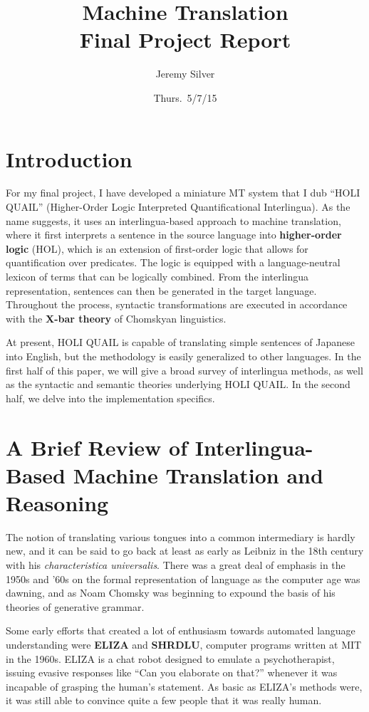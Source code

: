 \documentclass[11pt, oneside]{article}      %
\title{Machine Translation \\ Final Project Report}
\author{Jeremy Silver}
\date{Thurs.\ 5/7/15}                          %
\begin{document}
\maketitle

\section{Introduction}

For my final project, I have developed a miniature MT system that I dub ``HOLI QUAIL'' (Higher-Order Logic Interpreted Quantificational Interlingua).  As the name suggests, it uses an interlingua-based approach to machine translation, where it first interprets a sentence in the source language into \textbf{higher-order logic} (HOL), which is an extension of first-order logic that allows for quantification over predicates.  The logic is equipped with a language-neutral lexicon of terms that can be logically combined.  From the interlingua representation, sentences can then be generated in the target language.  Throughout the process, syntactic transformations are executed in accordance with the \textbf{X-bar theory} of Chomskyan linguistics.  

At present, HOLI QUAIL is capable of translating simple sentences of Japanese into English, but the methodology is easily generalized to other languages.  In the first half of this paper, we will give a broad survey of interlingua methods, as well as the syntactic and semantic theories underlying HOLI QUAIL.  In the second half, we delve into the implementation specifics.

\section{A Brief Review of Interlingua-Based Machine Translation and Reasoning }

The notion of translating various tongues into a common intermediary is hardly new, and it can be said to go back at least as early as Leibniz in the 18th century with his \textit{characteristica universalis}.  There was a great deal of emphasis in the 1950s and '60s on the formal representation of language as the computer age was dawning, and as Noam Chomsky was beginning to expound the basis of his theories of generative grammar.  

Some early efforts that created a lot of enthusiasm towards automated language understanding were \textbf{ELIZA} and \textbf{SHRDLU}, computer programs written at MIT in the 1960s.  ELIZA is a chat robot designed to emulate a psychotherapist, issuing evasive responses like ``Can you elaborate on that?'' whenever it was incapable of grasping the human's statement.  As basic as ELIZA's methods were, it was still able to convince quite a few people that it was really human.
\end{document}
